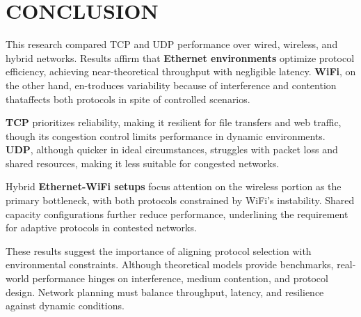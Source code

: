 \section{CONCLUSION} \label{sec:conclusion}

    This research compared TCP and UDP performance over wired, wireless, and hybrid networks. 
    Results affirm that \textbf{Ethernet environments} optimize protocol efficiency, achieving near-theoretical throughput with negligible latency. 
    \textbf{WiFi}, on the other hand, en-troduces variability because of interference and contention thataffects both protocols in spite of controlled scenarios.
    
    \noindent
    \textbf{TCP} prioritizes reliability, making it resilient for file transfers and web traffic, though its congestion control limits performance in dynamic environments. 
    \textbf{UDP}, although quicker in ideal circumstances, struggles with packet loss and shared resources, making it less suitable for congested networks.

    \noindent
    Hybrid \textbf{Ethernet-WiFi setups} focus attention on the wireless portion as the primary bottleneck, with both protocols constrained by WiFi’s instability. 
    Shared capacity configurations further reduce performance, underlining the requirement for adaptive protocols in contested networks.

    \noindent
    These results suggest the importance of aligning protocol selection with environmental constraints. 
    Although theoretical models provide benchmarks, real-world performance hinges on interference, medium contention, and protocol design. 
    Network planning must balance throughput, latency, and resilience against dynamic conditions.

        